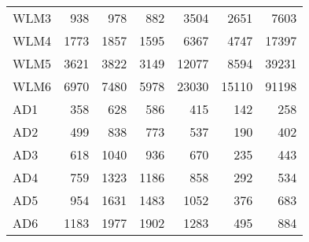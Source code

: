 \begin{table}[h]
\begin{center}
\begin{tabular}{||l||r|r|r||r|r|r||}
WLM3 &   938 &    978 &    882 &    3504 &    2651 &   7603\\
WLM4 &  1773 &   1857 &   1595 &    6367 &    4747 &  17397\\
WLM5 &  3621 &   3822 &   3149 &   12077 &    8594 &  39231\\
WLM6 &  6970 &   7480 &   5978 &   23030 &   15110 &  91198\\
\hline
 AD1 &   358 &    628 &    586 &     415 &     142 &    258\\
 AD2 &   499 &    838 &    773 &     537 &     190 &    402\\
 AD3 &   618 &   1040 &    936 &     670 &     235 &    443\\
 AD4 &   759 &   1323 &   1186 &     858 &     292 &    534\\
 AD5 &   954 &   1631 &   1483 &    1052 &     376 &    683\\
 AD6 &  1183 &   1977 &   1902 &	1283 &     495 &    884\\
\hline
\end{tabular}\end{center}
\end{table}

